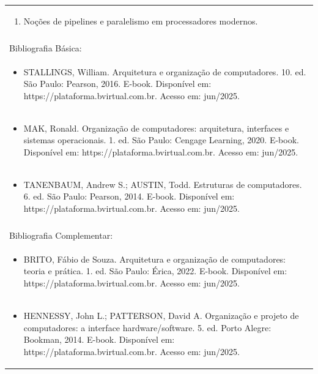 \documentclass[11pt]{article}
\begin{document}
\begin{center}
\begin{longtable}{|p{4cm}|p{4cm}|p{4cm}|p{4cm}|}
\multicolumn{4}{|p{\dimexpr 16cm + 6\tabcolsep\relax}|}{\begin{enumerate}[start=10]\item Noções de pipelines e paralelismo em processadores modernos.\end{enumerate}}\\
\multicolumn{4}{|p{\dimexpr 16cm + 6\tabcolsep\relax}|}{}\\
\hline
\multicolumn{4}{|p{16cm}|}{Bibliografia Básica:}\\*
\multicolumn{4}{|p{\dimexpr 16cm + 6\tabcolsep\relax}|}{\begin{itemize}\item STALLINGS, William. Arquitetura e organização de computadores. 10. ed. São Paulo: Pearson, 2016. E-book. Disponível em: https://plataforma.bvirtual.com.br. Acesso em: jun/2025.\end{itemize}}\\
\multicolumn{4}{|p{\dimexpr 16cm + 6\tabcolsep\relax}|}{\begin{itemize}\item MAK, Ronald. Organização de computadores: arquitetura, interfaces e sistemas operacionais. 1. ed. São Paulo: Cengage Learning, 2020. E-book. Disponível em: https://plataforma.bvirtual.com.br. Acesso em: jun/2025.\end{itemize}}\\
\multicolumn{4}{|p{\dimexpr 16cm + 6\tabcolsep\relax}|}{\begin{itemize}\item TANENBAUM, Andrew S.; AUSTIN, Todd. Estruturas de computadores. 6. ed. São Paulo: Pearson, 2014. E-book. Disponível em: https://plataforma.bvirtual.com.br. Acesso em: jun/2025.\end{itemize}}\\
\multicolumn{4}{|p{16cm}|}{}\\
\hline
\multicolumn{4}{|p{16cm}|}{Bibliografia Complementar:}\\*
\multicolumn{4}{|p{\dimexpr 16cm + 6\tabcolsep\relax}|}{\begin{itemize}\item BRITO, Fábio de Souza. Arquitetura e organização de computadores: teoria e prática. 1. ed. São Paulo: Érica, 2022. E-book. Disponível em: https://plataforma.bvirtual.com.br. Acesso em: jun/2025.\end{itemize}}\\
\multicolumn{4}{|p{\dimexpr 16cm + 6\tabcolsep\relax}|}{\begin{itemize}\item HENNESSY, John L.; PATTERSON, David A. Organização e projeto de computadores: a interface hardware/software. 5. ed. Porto Alegre: Bookman, 2014. E-book. Disponível em: https://plataforma.bvirtual.com.br. Acesso em: jun/2025.\end{itemize}}\\

\end{longtable}
\end{center}
\end{document}
